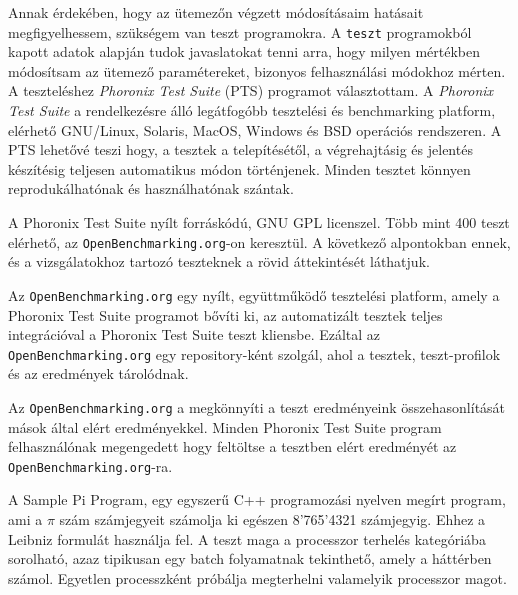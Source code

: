 

Annak érdekében, hogy az ütemezőn végzett módosításaim hatásait megfigyelhessem, szükségem van teszt programokra. A \texttt{teszt} programokból kapott adatok alapján tudok javaslatokat tenni arra, hogy milyen mértékben módosítsam az ütemező paramétereket, bizonyos felhasználási módokhoz mérten.
A teszteléshez \textit{Phoronix Test Suite} (PTS) programot választottam.
A \textit{Phoronix Test Suite} a rendelkezésre álló legátfogóbb tesztelési és benchmarking platform, elérhető GNU/Linux, Solaris, MacOS, Windows és BSD operációs rendszeren.
A PTS lehetővé teszi hogy, a tesztek a telepítésétől, a végrehajtásig és jelentés készítésig teljesen automatikus módon történjenek.
Minden tesztet könnyen reprodukálhatónak és használhatónak szántak.

A Phoronix Test Suite nyílt forráskódú, GNU GPL licenszel.
Több mint 400 teszt elérhető, az \texttt{OpenBenchmarking.org}-on keresztül.
A következő alpontokban ennek, és a vizsgálatokhoz tartozó teszteknek a rövid áttekintését láthatjuk.


Az \texttt{OpenBenchmarking.org} egy nyílt, együttműködő tesztelési platform, amely a Phoronix Test Suite programot bővíti ki, az automatizált tesztek teljes integrációval a Phoronix Test Suite teszt kliensbe.
Ezáltal az \texttt{OpenBenchmarking.org} egy repository-ként szolgál, ahol a tesztek, teszt-profilok és az eredmények tárolódnak.

Az \texttt{OpenBenchmarking.org} a megkönnyíti a teszt eredményeink összehasonlítását mások által elért eredményekkel.
Minden Phoronix Test Suite program felhasználónak megengedett hogy feltöltse a tesztben elért eredményét az \texttt{OpenBenchmarking.org}-ra.


A  Sample Pi Program, egy egyszerű C++ programozási nyelven megírt program, ami a $\pi$ szám számjegyeit számolja ki egészen 8'765'4321 számjegyig. Ehhez a Leibniz formulát használja fel. A teszt maga a processzor terhelés kategóriába sorolható, azaz tipikusan egy batch folyamatnak tekinthető, amely a háttérben számol. Egyetlen processzként próbálja megterhelni valamelyik processzor magot. 

